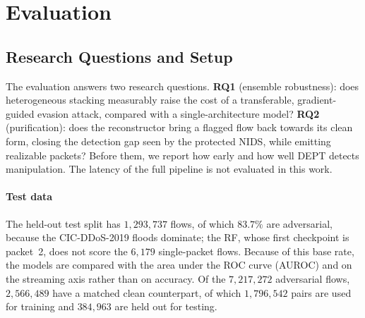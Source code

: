 \documentclass[acmtog,nonacm,pbalance]{acmart}
\begin{document}
\section{Evaluation}\label{sec:evaluation}

\subsection{Research Questions and Setup}

The evaluation answers two research questions. \textbf{RQ1} (ensemble
robustness): does heterogeneous stacking measurably raise the cost of a
transferable, gradient-guided evasion attack, compared with a
single-architecture model? \textbf{RQ2} (purification): does the reconstructor
bring a flagged flow back towards its clean form, closing the detection gap
seen by the protected NIDS, while emitting realizable packets? Before them, we
report how early and how well DEPT detects manipulation. The latency of the full
pipeline is not evaluated in this work.

\paragraph{Test data} The held-out test split has $1{,}293{,}737$ flows, of which
$83.7\%$ are adversarial, because the CIC-DDoS-2019 floods dominate; the RF, whose
first checkpoint is packet~2, does not score the $6{,}179$ single-packet flows.
Because of this base rate, the models are compared with the area under the ROC
curve (AUROC) and on the streaming axis rather than on accuracy. Of the $7{,}217{,}272$ adversarial
flows, $2{,}566{,}489$ have a matched clean counterpart, of which
$1{,}796{,}542$ pairs are used for training and $384{,}963$ are held out for testing.
\end{document}

